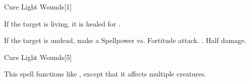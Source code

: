 \begin{spellsection}{Cure Light Wounds}[1]
    \begin{spellheader}
    \end{spellheader}
    \begin{spellcontent}
        \begin{spelltargetinginfo}
        \end{spelltargetinginfo}
        \begin{spelleffects}
            \spelleffect If the target is living, it is healed for \spelldamage{}.
            \begin{spellattacktriggered}{If the target is undead, make a Spellpower vs. Fortitude attack.}
                \spellsuccess {}.
                \spellfailure Half damage.
            \end{spellattacktriggered}
        \end{spelleffects}
    \end{spellcontent}
    \begin{spellfooter}
        \miscastrandom
    \end{spellfooter}
\end{spellsection}

\begin{spellsection}[Mass]{Cure Light Wounds}[5]
    \begin{spellheader}
    \end{spellheader}
    \begin{spellcontent}
        \begin{spelltargetinginfo}
        \end{spelltargetinginfo}
        \begin{spelleffects}
            \spellspecial This spell functions like , except that it affects multiple creatures.
        \end{spelleffects}
    \end{spellcontent}
    \begin{spellfooter}
        \miscastexplode
    \end{spellfooter}
\end{spellsection}

